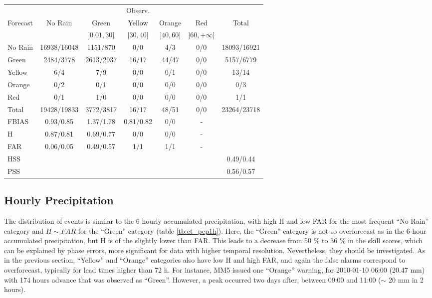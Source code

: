 \begin{table}[!htp]
\small
\centering
{}
\begin{tabular}{l|cccccc}
\toprule
         &         &             & Observ.   &           &                 & \\ 
Forecast & No Rain & Green       & Yellow    & Orange    & Red             & Total \\
         &         & $]0.01,30]$ & $]30,40]$ & $]40,60]$ & $]60,+\infty]$ &  \\
\midrule
No Rain & 16938/16048 & 1151/870 & 0/0 & 4/3 & 0/0 & 18093/16921 \\
Green & 2484/3778 & 2613/2937 & 16/17 & 44/47 & 0/0 & 5157/6779 \\
Yellow & 6/4 & 7/9 & 0/0 & 0/1 & 0/0 & 13/14 \\
Orange & 0/2 & 0/1 & 0/0 & 0/0 & 0/0 & 0/3 \\
Red & 0/1 & 1/0 & 0/0 & 0/0 & 0/0 & 1/1 \\
Total & 19428/19833 & 3772/3817 & 16/17 & 48/51 & 0/0 & 23264/23718 \\
\bottomrule
FBIAS & 0.93/0.85 & 1.37/1.78 & 0.81/0.82 & 0/0 & - & \\ 
H   & 0.87/0.81 & 0.69/0.77 & 0/0 & 0/0 & - & \\ 
FAR & 0.06/0.05 & 0.49/0.57 & 1/1 & 1/1 & - & \\ 
\midrule
HSS & & & & & & 0.49/0.44 \\
PSS & & & & & & 0.56/0.57 \\
\bottomrule
\end{tabular}
\label{tb:ct_pcp6h}
\end{table}
\FloatBarrier

\subsection{Hourly Precipitation}

The distribution of events is similar to the 6-hourly accumulated precipitation, with high H and low FAR for the most frequent “No Rain” category and $H \sim FAR$ for the “Green” category (table \ref{tb:ct_pcp1h}). Here, the “Green” category is not so overforecast as in the 6-hour accumulated precipitation, but H is of the slightly lower than FAR.  This leads to a decrease from 50 \% to 36 \% in the skill scores, which can be explained by phase errors, more significant for data with higher temporal resolution. Nevertheless, they should be investigated. As in the previous section, “Yellow” and “Orange” categories also have low H and high FAR, and again the false alarms correspond to overforecast, typically for lead times higher than 72 h. For instance, MM5 issued one “Orange” warning, for 2010-01-10 06:00 (20.47 mm) with 174 hours advance that was observed as “Green”.  However, a peak occurred two days after, between 09:00 and 11:00 ($\sim$ 20 mm in 2 hours).

